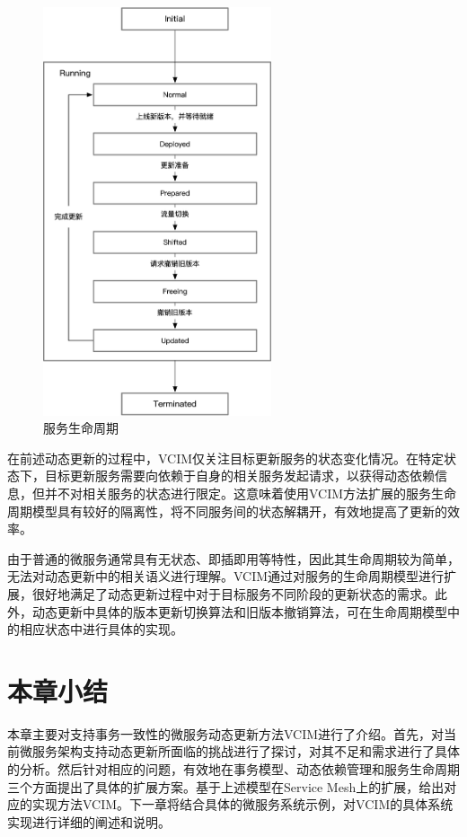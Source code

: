 \documentclass[macfonts,master]{njuthesis}
\begin{document}
\begin{figure}[!htbp]
  \centering
  \includegraphics[width= 0.6\textwidth]{image/svc_lifecycle.png}
  \caption{服务生命周期}
  \label{fig:svc_lifecycle}
\end{figure}

在前述动态更新的过程中，VCIM仅关注目标更新服务的状态变化情况。在特定状态下，目标更新服务需要向依赖于自身的相关服务发起请求，以获得动态依赖信息，但并不对相关服务的状态进行限定。这意味着使用VCIM方法扩展的服务生命周期模型具有较好的隔离性，将不同服务间的状态解耦开，有效地提高了更新的效率。

由于普通的微服务通常具有无状态、即插即用等特性，因此其生命周期较为简单，无法对动态更新中的相关语义进行理解。VCIM通过对服务的生命周期模型进行扩展，很好地满足了动态更新过程中对于目标服务不同阶段的更新状态的需求。此外，动态更新中具体的版本更新切换算法和旧版本撤销算法，可在生命周期模型中的相应状态中进行具体的实现。

\section{本章小结}
本章主要对支持事务一致性的微服务动态更新方法VCIM进行了介绍。首先，对当前微服务架构支持动态更新所面临的挑战进行了探讨，对其不足和需求进行了具体的分析。然后针对相应的问题，有效地在事务模型、动态依赖管理和服务生命周期三个方面提出了具体的扩展方案。基于上述模型在Service Mesh上的扩展，给出对应的实现方法VCIM。下一章将结合具体的微服务系统示例，对VCIM的具体系统实现进行详细的阐述和说明。
\end{document}
